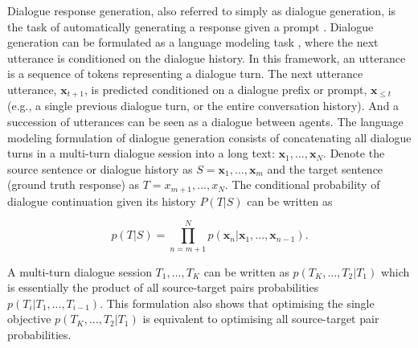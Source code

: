 
Dialogue response generation, also referred to simply as dialogue generation, is the task of automatically generating a response given a prompt \citep{madotto-etal-2020-plug}. 
Dialogue generation can be formulated as a language modeling task \citep{welleck-etal-2019-dialogue, zhang2019dialogpt}, where the next utterance is conditioned on the dialogue history.
In this framework, an utterance is a sequence of tokens representing a dialogue turn. The next utterance utterance, $\textbf{x}_{t + 1}$, is predicted conditioned on a dialogue prefix or prompt, $\textbf{x}_{\leq t}$ (e.g., a single previous dialogue turn, or the entire conversation history). And a succession of utterances can be seen as a dialogue between agents.
The language modeling formulation of dialogue generation consists of concatenating all dialogue turns in a multi-turn dialogue session into a long text: $\textbf{x}_1, ..., \textbf{x}_N$. Denote the source sentence or dialogue history as $S = \textbf{x}_1, ..., \textbf{x}_m$ and the target sentence (ground truth response) as $T = x_{m + 1}, ..., x_N$. The conditional probability of dialogue continuation given its history $P(T | S)$ can be written as

\begin{equation}
    p(T | S) = \prod_{n = m + 1}^N p(\textbf{x}_n | \textbf{x}_1, ..., \textbf{x}_{n - 1}).
\end{equation}

A multi-turn dialogue session $T_1, ..., T_K$ can be written as $p(T_K, ..., T_2 | T_1)$ which is essentially the product of all source-target pairs probabilities $p(T_i | T_1, ..., T_{i - 1})$. This formulation also shows that optimising the single objective $p(T_K, ..., T_2 | T_1)$ is equivalent to optimising all source-target pair probabilities.

